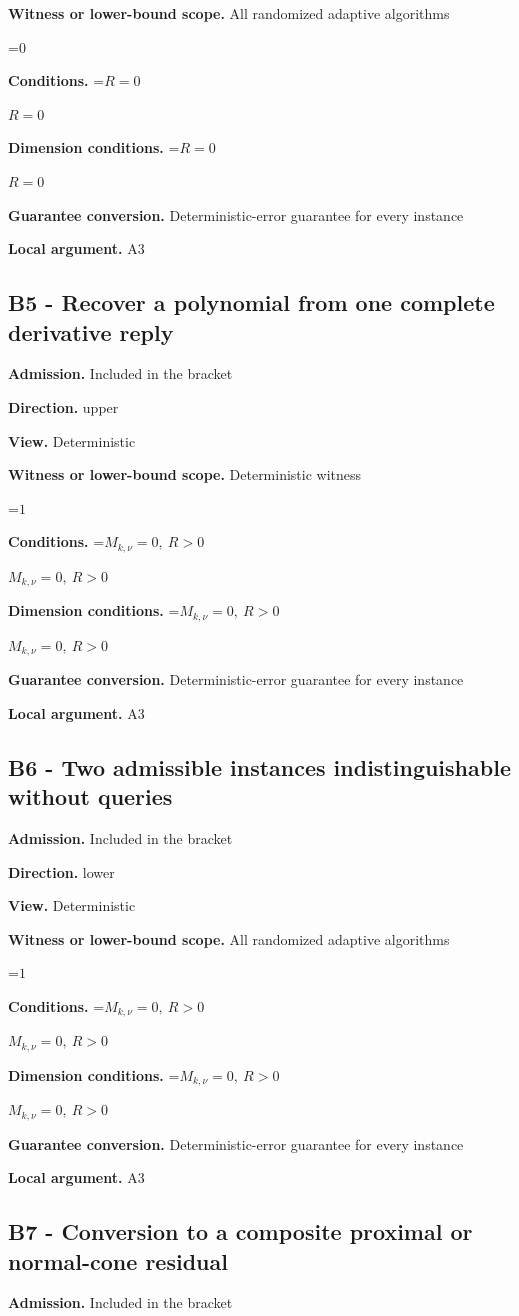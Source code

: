 \documentclass[10pt,a4paper]{article}
\newcommand{\AtlasMath}[1]{\par\begingroup\centering\setbox0=\hbox{$\displaystyle #1$}\ifdim\wd0>1.4\linewidth\typeout{ATLAS WIDE FORMULA: \the\wd0}\fi\ifdim\wd0>\linewidth\resizebox{\linewidth}{!}{\box0}\else\box0\fi\par\endgroup}
\newcommand{\AtlasInlineMath}[1]{\begingroup\setbox0=\hbox{$#1$}\ifdim\wd0>.4\linewidth\endgroup\AtlasMath{#1}\else\endgroup$#1$\fi}
\begin{document}
\textbf{Witness or lower-bound scope.} All randomized adaptive algorithms

\AtlasMath{0}
\textbf{Conditions.} \AtlasInlineMath{R=0}

\textbf{Dimension conditions.} \AtlasInlineMath{R=0}

\textbf{Guarantee conversion.} Deterministic-error guarantee for every instance

\textbf{Local argument.} A3

\subsection{B5 - Recover a polynomial from one complete derivative reply}
\textbf{Admission.} Included in the bracket

\textbf{Direction.} upper

\textbf{View.} Deterministic

\textbf{Witness or lower-bound scope.} Deterministic witness

\AtlasMath{1}
\textbf{Conditions.} \AtlasInlineMath{M_{k,\nu}=0,\ R>0}

\textbf{Dimension conditions.} \AtlasInlineMath{M_{k,\nu}=0,\ R>0}

\textbf{Guarantee conversion.} Deterministic-error guarantee for every instance

\textbf{Local argument.} A3

\subsection{B6 - Two admissible instances indistinguishable without queries}
\textbf{Admission.} Included in the bracket

\textbf{Direction.} lower

\textbf{View.} Deterministic

\textbf{Witness or lower-bound scope.} All randomized adaptive algorithms

\AtlasMath{1}
\textbf{Conditions.} \AtlasInlineMath{M_{k,\nu}=0,\ R>0}

\textbf{Dimension conditions.} \AtlasInlineMath{M_{k,\nu}=0,\ R>0}

\textbf{Guarantee conversion.} Deterministic-error guarantee for every instance

\textbf{Local argument.} A3

\subsection{B7 - Conversion to a composite proximal or normal-cone residual}
\textbf{Admission.} Included in the bracket
\end{document}

